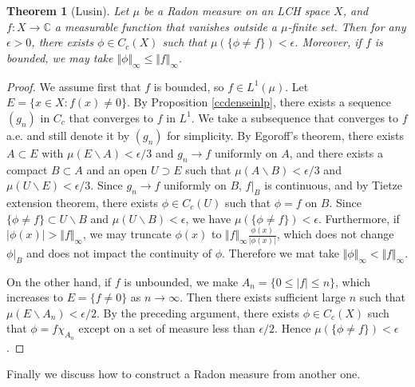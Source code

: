 \documentclass{article}
\numberwithin{equation}{section}
\newcommand{\bbC}{\mathbb{C}}
\theoremstyle{plain}
\newtheorem{theorem}{Theorem}[section]
\theoremstyle{definition}
\begin{document}
\begin{theorem}[Lusin]\label{lusin}
	Let $\mu$ be a Radon measure on an LCH space $X$, and $f:X\to\bbC$ a measurable function that vanishes outside a $\mu$-finite set. Then for any $\epsilon>0$, there exists $\phi\in C_c(X)$ such that $\mu(\{\phi\neq f\})<\epsilon$. Moreover, if $f$ is bounded, we may take $\Vert\phi\Vert_\infty\leq\Vert f\Vert_\infty$.
\end{theorem}
\begin{proof}
	We assume first that $f$ is bounded, so $f\in L^1(\mu)$. Let $E=\{x\in X:f(x)\neq 0\}$. By Proposition \ref{ccdenseinlp}, there exists a sequence $(g_n)$ in $C_c$ that converges to $f$ in $L^1$. We take a subsequence that converges to $f$ a.e. and still denote it by $(g_n)$ for simplicity. By Egoroff's theorem, there exists $A\subset E$ with $\mu(E\backslash A)<\epsilon/3$ and $g_n\to f$ uniformly on $A$, and there exists a compact $B\subset A$ and an open $U\supset E$ such that $\mu(A\backslash B)<\epsilon/3$ and $\mu(U\backslash E)<\epsilon/3$. Since $g_n\to f$ uniformly on $B$, $f|_B$ is continuous, and by Tietze extension theorem, there exists $\phi\in C_c(U)$ such that $\phi=f$ on $B$. Since $\{\phi\neq f\}\subset U\backslash B$ and $\mu(U\backslash B)<\epsilon$, we have $\mu(\{\phi\neq f\})<\epsilon$. Furthermore, if $\vert\phi(x)\vert>\Vert f\Vert_\infty$, we may truncate $\phi(x)$ to $\Vert f\Vert_\infty\frac{\phi(x)}{\vert\phi(x)\vert}$, which does not change $\phi|_B$ and does not impact the continuity of $\phi$. Therefore we mat take $\Vert\phi\Vert_\infty<\Vert f\Vert_\infty$.
	
	On the other hand, if $f$ is unbounded, we make $A_n=\{0\leq\vert f\vert\leq n\}$, which increases to $E=\{f\neq 0\}$ as $n\to\infty$. Then there exists sufficient large $n$ such that $\mu(E\backslash A_n)<\epsilon/2$. By the preceding argument, there exists $\phi\in C_c(X)$ such that $\phi=f\chi_{A_n}$ except on a set of measure less than $\epsilon/2$. Hence $\mu(\{\phi\neq f\})<\epsilon$. 
\end{proof}

Finally we discuss how to construct a Radon measure from another one.
\end{document}
